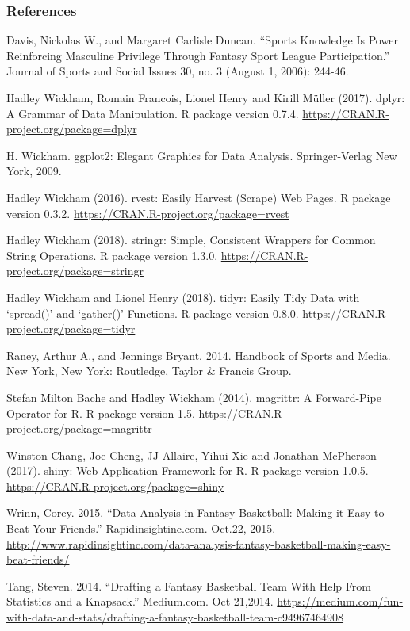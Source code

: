 \documentclass[]{article}
\begin{document}
\subsubsection{References}\label{references}

Davis, Nickolas W., and Margaret Carlisle Duncan. ``Sports Knowledge Is
Power Reinforcing Masculine Privilege Through Fantasy Sport League
Participation.'' Journal of Sports and Social Issues 30, no. 3 (August
1, 2006): 244-46.

Hadley Wickham, Romain Francois, Lionel Henry and Kirill Müller (2017).
dplyr: A Grammar of Data Manipulation. R package version 0.7.4.
\url{https://CRAN.R-project.org/package=dplyr}

H. Wickham. ggplot2: Elegant Graphics for Data Analysis. Springer-Verlag
New York, 2009.

Hadley Wickham (2016). rvest: Easily Harvest (Scrape) Web Pages. R
package version 0.3.2. \url{https://CRAN.R-project.org/package=rvest}

Hadley Wickham (2018). stringr: Simple, Consistent Wrappers for Common
String Operations. R package version 1.3.0.
\url{https://CRAN.R-project.org/package=stringr}

Hadley Wickham and Lionel Henry (2018). tidyr: Easily Tidy Data with
`spread()' and `gather()' Functions. R package version 0.8.0.
\url{https://CRAN.R-project.org/package=tidyr}

Raney, Arthur A., and Jennings Bryant. 2014. Handbook of Sports and
Media. New York, New York: Routledge, Taylor \& Francis Group.

Stefan Milton Bache and Hadley Wickham (2014). magrittr: A Forward-Pipe
Operator for R. R package version 1.5.
\url{https://CRAN.R-project.org/package=magrittr}

Winston Chang, Joe Cheng, JJ Allaire, Yihui Xie and Jonathan McPherson
(2017). shiny: Web Application Framework for R. R package version 1.0.5.
\url{https://CRAN.R-project.org/package=shiny}

Wrinn, Corey. 2015. ``Data Analysis in Fantasy Basketball: Making it
Easy to Beat Your Friends.'' Rapidinsightinc.com. Oct.22, 2015.
\url{http://www.rapidinsightinc.com/data-analysis-fantasy-basketball-making-easy-beat-friends/}

Tang, Steven. 2014. ``Drafting a Fantasy Basketball Team With Help From
Statistics and a Knapsack.'' Medium.com. Oct 21,2014.
\url{https://medium.com/fun-with-data-and-stats/drafting-a-fantasy-basketball-team-c94967464908}
\end{document}
